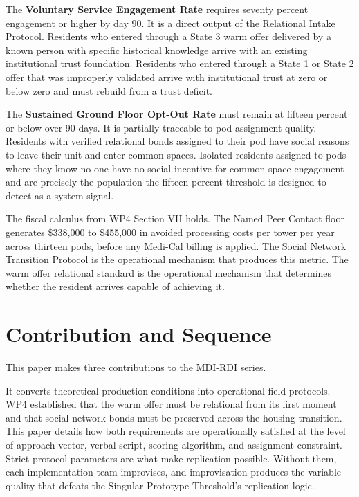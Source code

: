 \documentclass[12pt, letterpaper]{article}
\begin{document}
The \textbf{Voluntary Service Engagement Rate} requires seventy percent engagement or higher by day 90. It is a direct output of the Relational Intake Protocol. Residents who entered through a State 3 warm offer delivered by a known person with specific historical knowledge arrive with an existing institutional trust foundation. Residents who entered through a State 1 or State 2 offer that was improperly validated arrive with institutional trust at zero or below zero and must rebuild from a trust deficit.

The \textbf{Sustained Ground Floor Opt-Out Rate} must remain at fifteen percent or below over 90 days. It is partially traceable to pod assignment quality. Residents with verified relational bonds assigned to their pod have social reasons to leave their unit and enter common spaces. Isolated residents assigned to pods where they know no one have no social incentive for common space engagement and are precisely the population the fifteen percent threshold is designed to detect as a system signal.

The fiscal calculus from WP4 Section VII holds. The Named Peer Contact floor generates \$338,000 to \$455,000 in avoided processing costs per tower per year across thirteen pods, before any Medi-Cal billing is applied. The Social Network Transition Protocol is the operational mechanism that produces this metric. The warm offer relational standard is the operational mechanism that determines whether the resident arrives capable of achieving it.


\clearpage
\section{Contribution and Sequence}

This paper makes three contributions to the MDI-RDI series.

It converts theoretical production conditions into operational field protocols. WP4 established that the warm offer must be relational from its first moment and that social network bonds must be preserved across the housing transition. This paper details how both requirements are operationally satisfied at the level of approach vector, verbal script, scoring algorithm, and assignment constraint. Strict protocol parameters are what make replication possible. Without them, each implementation team improvises, and improvisation produces the variable quality that defeats the Singular Prototype Threshold's replication logic.
\end{document}
